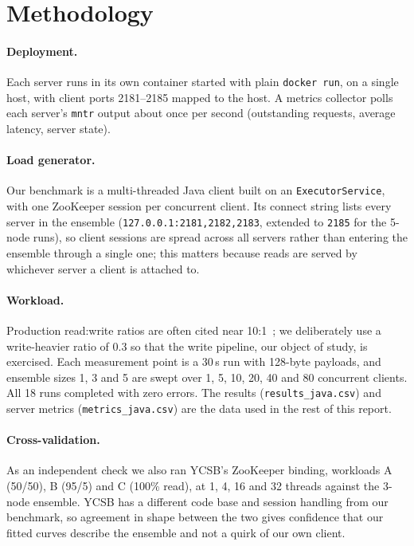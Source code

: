 \documentclass{llncs}
\begin{document}
\section{Methodology}
\label{sec:method}

\paragraph{Deployment.} Each server runs in its own container started with
plain \texttt{docker run}, on a single host, with client ports 2181--2185
mapped to the host. A metrics collector polls each server's \texttt{mntr}
output about once per second (outstanding requests, average latency,
server state).

\paragraph{Load generator.} Our benchmark is a multi-threaded Java client
built on an \texttt{ExecutorService}, with one ZooKeeper session per
concurrent client. Its connect string lists every server in the ensemble
(\texttt{127.0.0.1:2181,2182,2183}, extended to \texttt{2185} for the
5-node runs), so client sessions are spread across all servers rather than
entering the ensemble through a single one; this matters because reads are
served by whichever server a client is attached to.

\paragraph{Workload.} Production read:write ratios are often cited near
10:1~\cite{mit_6824_zookeeper}; we deliberately use a write-heavier ratio of
0.3 so that the write pipeline, our object of study, is exercised. Each
measurement point is a 30\,s run with 128-byte payloads, and ensemble sizes
1, 3 and 5 are swept over 1, 5, 10, 20, 40 and 80 concurrent clients. All
18 runs completed with zero errors. The results
(\texttt{results\_java.csv}) and server metrics
(\texttt{metrics\_java.csv}) are the data used in the rest of this report.

\paragraph{Cross-validation.} As an independent check we also ran YCSB's
ZooKeeper binding, workloads A (50/50), B (95/5) and C (100\% read), at 1,
4, 16 and 32 threads against the 3-node ensemble. YCSB has a different
code base and session handling from our benchmark, so agreement in shape
between the two gives confidence that our fitted curves describe the
ensemble and not a quirk of our own client.
\end{document}
